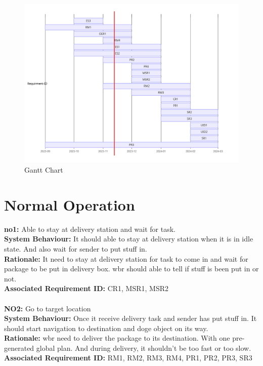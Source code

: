 \documentclass[12pt]{article}
\begin{document}
\begin{figure}[H]
    \centering
    \includegraphics[width=\textwidth,height=\textheight,keepaspectratio]{../gantt chart.png}
    \caption{Gantt Chart}
\end{figure}

\section{Normal Operation}
\textbf{\acrshort{no}1:} Able to stay at delivery station and wait for task. \\
\textbf{System Behaviour:} It should able to stay at delivery station when it is in idle state. And also wait for sender to put stuff in. \\
\textbf{Rationale:} It need to stay at delivery station for task to come in and wait for package to be put in delivery box. \acrshort{wbr} should able to tell if stuff is been put in or not.\\
\textbf{Associated Requirement ID:} CR1, MSR1, MSR2 \\\\

\noindent\textbf{NO2:} Go to target location  \\
\textbf{System Behaviour:} Once it receive delivery task and sender has put stuff in. It should start navigation to destination and doge object on its way.\\
\textbf{Rationale:} \acrshort{wbr} need to deliver the package to its destination. With one pre-generated global plan. And during delivery, it shouldn't be too fast or too slow.  \\
\textbf{Associated Requirement ID:} RM1, RM2, RM3, RM4, PR1, PR2, PR3, SR3 \\\\
\end{document}
